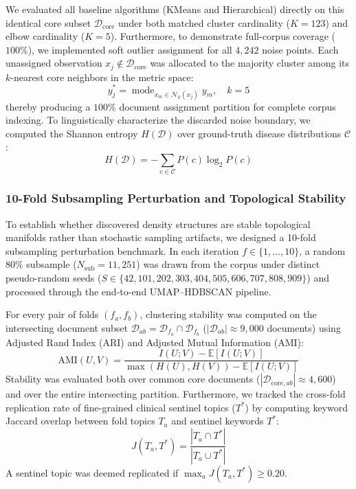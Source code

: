 \documentclass[a4paper,fleqn]{cas-dc}
\begin{document}
We evaluated all baseline algorithms (KMeans and Hierarchical) directly on this identical core subset $\mathcal{D}_{\text{core}}$ under both matched cluster cardinality ($K=123$) and elbow cardinality ($K=5$). Furthermore, to demonstrate full-corpus coverage ($100\%$), we implemented soft outlier assignment for all $4{,}242$ noise points. Each unassigned observation $x_j \notin \mathcal{D}_{\text{core}}$ was allocated to the majority cluster among its $k$-nearest core neighbors in the metric space:
\begin{equation}
y_j^* = \operatorname{mode}_{x_m \in \mathcal{N}_k(x_j)} y_m, \quad k=5
\end{equation}
thereby producing a $100\%$ document assignment partition for complete corpus indexing. To linguistically characterize the discarded noise boundary, we computed the Shannon entropy $H(\mathcal{D})$ over ground-truth disease distributions $\mathcal{C}$:
\begin{equation}
H(\mathcal{D}) = - \sum_{c \in \mathcal{C}} P(c) \log_2 P(c)
\end{equation}

\subsubsection{10-Fold Subsampling Perturbation and Topological Stability}

To establish whether discovered density structures are stable topological manifolds rather than stochastic sampling artifacts, we designed a 10-fold subsampling perturbation benchmark. In each iteration $f \in \{1, \dots, 10\}$, a random $80\%$ subsample ($N_{\text{sub}} = 11{,}251$) was drawn from the corpus under distinct pseudo-random seeds ($S \in \{42, 101, 202, 303, 404, 505, 606, 707, 808, 909\}$) and processed through the end-to-end UMAP--HDBSCAN pipeline.

For every pair of folds $(f_a, f_b)$, clustering stability was computed on the intersecting document subset $\mathcal{D}_{ab} = \mathcal{D}_{f_a} \cap \mathcal{D}_{f_b}$ ($|\mathcal{D}_{ab}| \approx 9{,}000$ documents) using Adjusted Rand Index (ARI) and Adjusted Mutual Information (AMI):
\begin{equation}
\text{AMI}(U, V) = \frac{I(U; V) - \mathbb{E}[I(U; V)]}{\max(H(U), H(V)) - \mathbb{E}[I(U; V)]}
\end{equation}
Stability was evaluated both over common core documents ($|\mathcal{D}_{\text{core}, ab}| \approx 4{,}600$) and over the entire intersecting partition. Furthermore, we tracked the cross-fold replication rate of fine-grained clinical sentinel topics ($T^*$) by computing keyword Jaccard overlap between fold topics $T_a$ and sentinel keywords $T^*$:
\begin{equation}
J(T_a, T^*) = \frac{|T_a \cap T^*|}{|T_a \cup T^*|}
\end{equation}
A sentinel topic was deemed replicated if $\max_{a} J(T_a, T^*) \ge 0.20$.
\end{document}
